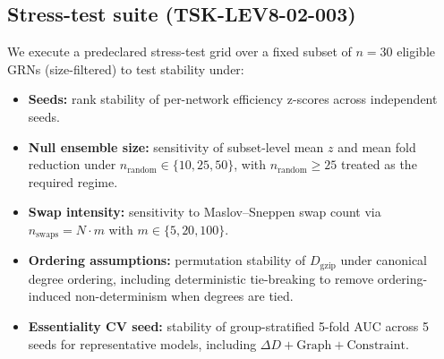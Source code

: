 \documentclass[11pt]{article}
\begin{document}
\subsection*{Stress-test suite (TSK-LEV8-02-003)}
We execute a predeclared stress-test grid over a fixed subset of $n=30$ eligible GRNs (size-filtered) to test stability under:
\begin{itemize}
    \item \textbf{Seeds:} rank stability of per-network efficiency z-scores across independent seeds.
    \item \textbf{Null ensemble size:} sensitivity of subset-level mean $z$ and mean fold reduction under $n_{\mathrm{random}} \in \{10,25,50\}$, with $n_{\mathrm{random}}\ge 25$ treated as the required regime.
    \item \textbf{Swap intensity:} sensitivity to Maslov--Sneppen swap count via $n_{\mathrm{swaps}} = N \cdot m$ with $m \in \{5,20,100\}$.
    \item \textbf{Ordering assumptions:} permutation stability of $D_{\mathrm{gzip}}$ under canonical degree ordering, including deterministic tie-breaking to remove ordering-induced non-determinism when degrees are tied.
    \item \textbf{Essentiality CV seed:} stability of group-stratified 5-fold AUC across 5 seeds for representative models, including $\Delta D+\mathrm{Graph}+\mathrm{Constraint}$.
\end{itemize}
\end{document}
